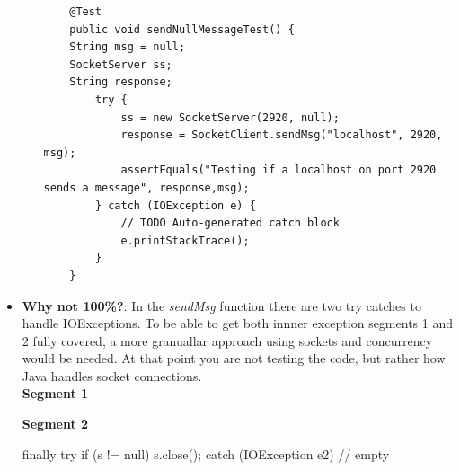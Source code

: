 \documentclass[fontsize=12pt,paper=letter,twoside]{scrartcl}
\begin{document}
\begin{itemize}
\begin{itemize}
\begin{lstlisting}
    @Test
    public void sendNullMessageTest() {
    String msg = null;
    SocketServer ss;
    String response;
        try {
            ss = new SocketServer(2920, null);
            response = SocketClient.sendMsg("localhost", 2920, msg);
            assertEquals("Testing if a localhost on port 2920 sends a message", response,msg);
        } catch (IOException e) {
            // TODO Auto-generated catch block
            e.printStackTrace();
        }
    }
\end{lstlisting}
\end{itemize}
\item \textbf{Why not 100\%?}: In the \emph{sendMsg} function there are two try catches to handle IOExceptions. To be able to get both innner exception segments 1 and 2 fully covered, a more granuallar approach using sockets and concurrency would be needed. At that point you are not testing the code, but rather how Java handles socket connections.
\\
\textbf{Segment 1}
    \begin{code}
    } catch (IOException e) {
            if (s != null)
                s.close();
            throw e;
    }
    \end{code} 
\textbf{Segment 2}
    \begin{code}
    finally {
            try {
                if (s != null)
                    s.close();
            } catch (IOException e2) {
                // empty
            }
        }
    \end{code} 

\end{itemize}
\end{document}
